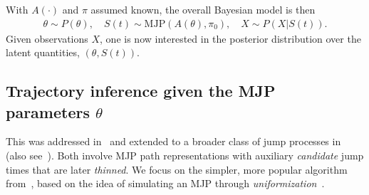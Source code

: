 With $A(\cdot)$ and $\pi$ assumed known, the overall Bayesian model is then 
\begin{align}
  \label{eq:bayes_model}
  \theta \sim P(\theta), \quad S(t) \sim \text{MJP}(A(\theta), \pi_0), \quad X \sim P(X|S(t)).
\end{align}
Given observations $X$, one is now interested in the posterior distribution over the latent quantities, $(\theta,S(t))$. 

\subsection{Trajectory inference given the MJP parameters $\theta$}
This was addressed in~\cite{RaoTeh13}  and extended to a broader class of jump processes in~\cite{RaoTeh12} (also see~\cite{FearnSher2006, Hobolth09, Elhaygibbssampling}). 
Both involve MJP path representations with auxiliary {\em candidate} jump times that are later {\em thinned}.  
We focus on the simpler, more popular algorithm from~\cite{RaoTeh13}, based on the idea of simulating an MJP through {\em uniformization}~\citep{Jen1953}. 

